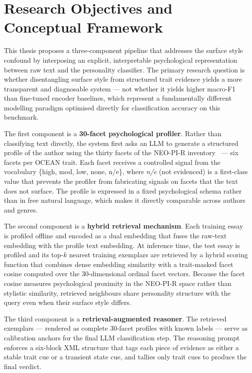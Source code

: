 \documentclass[../main.tex]{subfiles}
\begin{document}
\section{Research Objectives and Conceptual Framework}
\label{sec:objectives}

This thesis proposes a three-component pipeline that addresses the surface style confound by interposing an explicit, interpretable psychological representation between raw text and the personality classifier. The primary research question is whether disentangling surface style from structured trait evidence yields a more transparent and diagnosable system --- not whether it yields higher macro-F1 than fine-tuned encoder baselines, which represent a fundamentally different modelling paradigm optimised directly for classification accuracy on this benchmark.

The first component is a \textbf{30-facet psychological profiler}. Rather than classifying text directly, the system first asks an LLM to generate a structured profile of the author using the thirty facets of the NEO-PI-R inventory~\cite{costa2008revised} --- six facets per OCEAN trait. Each facet receives a controlled signal from the vocabulary \{high, mod, low, none, n/e\}, where \textit{n/e} (not evidenced) is a first-class value that prevents the profiler from fabricating signals on facets that the text does not surface. The profile is expressed in a fixed psychological schema rather than in free natural language, which makes it directly comparable across authors and genres.

The second component is a \textbf{hybrid retrieval mechanism}. Each training essay is profiled offline and encoded as a dual embedding that fuses the raw-text embedding with the profile text embedding. At inference time, the test essay is profiled and its top-$k$ nearest training exemplars are retrieved by a hybrid scoring function that combines dense embedding similarity with a trait-masked facet cosine computed over the 30-dimensional ordinal facet vectors. Because the facet cosine measures psychological proximity in the NEO-PI-R space rather than stylistic similarity, retrieved neighbours share personality structure with the query even when their surface style differs.

The third component is a \textbf{retrieval-augmented reasoner}. The retrieved exemplars --- rendered as complete 30-facet profiles with known labels --- serve as calibration anchors for the final LLM classification step. The reasoning prompt enforces a six-block XML structure that tags each piece of evidence as either a stable trait cue or a transient state cue, and tallies only trait cues to produce the final verdict.
\end{document}
